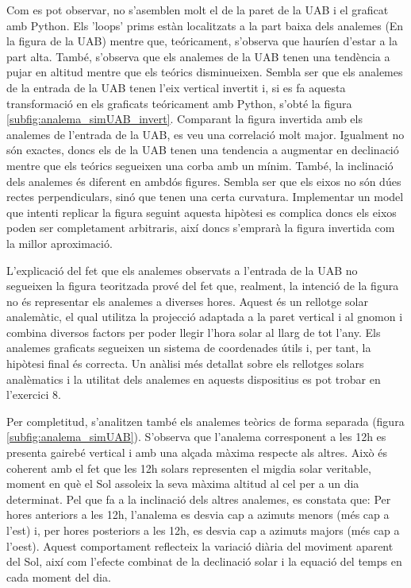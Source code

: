 \documentclass[a4paper, 11pt]{article}
\begin{document}
\noindent Com es pot observar, no s'asemblen molt el de la paret de la UAB i el graficat amb Python. Els 'loops' prims estàn localitzats a la part baixa dels analemes (En la figura de la UAB) mentre que, teóricament, s'observa que hauríen d'estar a la part alta. També, s'observa que els analemes de la UAB tenen una tendència a pujar en altitud mentre que els teórics disminueixen. Sembla ser que els analemes de la entrada de la UAB tenen l'eix vertical invertit i, si es fa aquesta transformació en els graficats teóricament amb Python, s'obté la figura \ref{subfig:analema_simUAB_invert}. Comparant la figura invertida amb els analemes de l'entrada de la UAB, es veu una correlació molt major. Igualment no són exactes, doncs els de la UAB tenen una tendencia a augmentar en declinació mentre que els teórics segueixen una corba amb un mínim. També, la inclinació dels analemes és diferent en ambdós figures. Sembla ser que els eixos no són dúes rectes perpendiculars, sinó que tenen una certa curvatura. Implementar un model que intenti replicar la figura seguint aquesta hipòtesi es complica doncs els eixos poden ser completament arbitraris, així doncs s'emprarà la figura invertida com la millor aproximació.

\vspace{2mm}

\noindent L'explicació del fet que els analemes observats a l'entrada de la UAB no segueixen la figura teoritzada prové del fet que, realment, la intenció de la figura no és representar els analemes a diverses hores. Aquest és un rellotge solar analemàtic, el qual utilitza la projecció adaptada a la paret vertical i al gnomon i combina diversos factors per poder llegir l'hora solar al llarg de tot l'any. Els analemes graficats segueixen un sistema de coordenades útils i, per tant, la hipòtesi final és correcta. Un anàlisi més detallat sobre els rellotges solars analèmatics i la utilitat dels analemes en aquests dispositius es pot trobar en l'exercici 8.

\vspace{2mm}

\noindent Per completitud, s'analitzen també els analemes teòrics de forma separada (figura \ref{subfig:analema_simUAB}). S'observa que l'analema corresponent a les 12h es presenta gairebé vertical i amb una alçada màxima respecte als altres. Això és coherent amb el fet que les 12h solars representen el migdia solar veritable, moment en què el Sol assoleix la seva màxima altitud al cel per a un dia determinat. Pel que fa a la inclinació dels altres analemes, es constata que: Per hores anteriors a les 12h, l'analema es desvia cap a azimuts menors (més cap a l'est) i, per hores posteriors a les 12h, es desvia cap a azimuts majors (més cap a l'oest). Aquest comportament reflecteix la variació diària del moviment aparent del Sol, així com l'efecte combinat de la declinació solar i la equació del temps en cada moment del dia.
\end{document}
